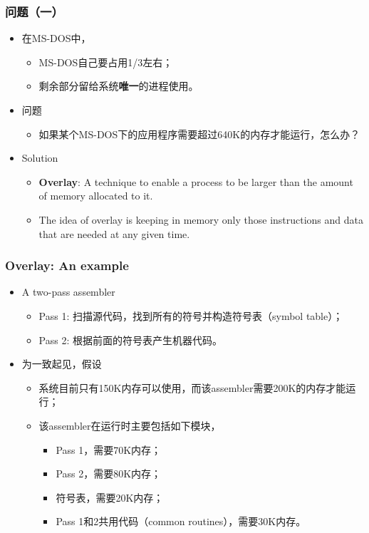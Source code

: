 \documentclass[CJKutf8,xcolor=pdftex,dvipsnames,table]{beamer}
\begin{document}
\begin{CJK*}{UTF8}{song}
  \begin{frame}
  \frametitle{问题（一）} \pause
  \begin{itemize}
  \item{在MS-DOS中，}  \pause
    \begin{itemize}
    \item{MS-DOS自己要占用1/3左右；} \pause
    \item{剩余部分留给系统\textbf{唯一}的进程使用。} \pause
    \end{itemize}
  \item{问题}  \pause
    \begin{itemize}
    \item{如果某个MS-DOS下的应用程序需要超过640K的内存才能运行，怎么办？} \pause
    \end{itemize}
  \item{Solution} \pause
    \begin{itemize}
    \item{\textbf{Overlay}: A technique to enable a process to be larger than the amount of memory allocated to it.} \pause
    \item{The idea of overlay is keeping in memory only those instructions and data that are needed at any given time.}
    \end{itemize}
  \end{itemize}
  \end{frame}
  
  \begin{frame}
  \frametitle{Overlay: An example}
  \begin{itemize}
  \item{A two-pass assembler \pause}
    \begin{itemize}
    \item{Pass 1: 扫描源代码，找到所有的符号并构造符号表（symbol table）；} \pause
    \item{Pass 2: 根据前面的符号表产生机器代码。} \pause
    \end{itemize}
  \item{为一致起见，假设} \pause
    \begin{itemize}
    \item{系统目前只有150K内存可以使用，而该assembler需要200K的内存才能运行；} \pause
    \item{该assembler在运行时主要包括如下模块，} \pause
      \begin{itemize}
      \item{Pass 1，需要70K内存；} \pause
      \item{Pass 2，需要80K内存；} \pause
      \item{符号表，需要20K内存；} \pause
      \item{Pass 1和2共用代码（common routines），需要30K内存。}
      \end{itemize}
    \end{itemize}
  \end{itemize}
  \end{frame}
  

\end{CJK*}
\end{document}
